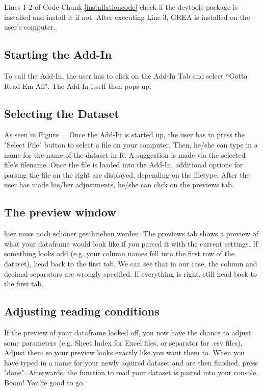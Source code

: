 \documentclass[12pt]{article} %
\begin{document}
Lines 1-2 of Code-Chunk \ref{installationcode} check if the devtools package is installed and install it if not. After executing Line 3, GREA is installed on the user's computer.

\subsection{Starting the Add-In}

To call the Add-In, the user has to click on the Add-In Tab and select ``Gotta Read Em All". The Add-In itself then pops up.

\subsection{Selecting the Dataset}

As seen in Figure ... Once the Add-In is started up, the user has to press the "Select File" button to select a file on your computer. Then, he/she can type in a name for the name of the dataset in R. A suggestion is made via the selected file's filename. Once the file is loaded into the Add-In, additional options for parsing the file on the right are displayed, depending on the filetype. After the user has made his/her adjustments, he/she can click on the previews tab.

\subsection{The preview window}

hier muss noch schöner geschrieben werden.
The previews tab shows a preview of what your dataframe would look like if you parsed it with the current settings. If something looks odd (e.g. your column names fell into the first row of the dataset), head back to the first tab. We can see that in our case, the column and decimal separators are wrongly specified. If everything is right, still head back to the first tab. 

\subsection{Adjusting reading conditions}
If the preview of your dataframe looked off, you now have the chance to adjust some parameters (e.g. Sheet Index for Excel files, or separator for .csv files). Adjust them so your preview looks exactly like you want them to. When you have typed in a name for your newly aquired dataset and are then finished, press "done". Afterwards, the function to read your dataset is pasted into your console. Boom! You're good to go.
\end{document}
